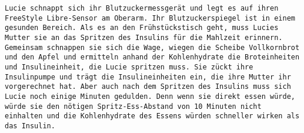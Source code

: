 		 \texttt{Lucie schnappt sich ihr Blutzuckermessgerät und legt es auf ihren\newline
		 	 FreeStyle Libre-Sensor am Oberarm. Ihr Blutzuckerspiegel ist in einem \newline 
		 	 gesunden Bereich. Als es an den Frühstückstisch geht, muss Lucies Mutter \newline
		 	 sie an das Spritzen des Insulins für die Mahlzeit erinnern. Gemeinsam \newline
		 	 schnappen sie sich die  Wage, wiegen die Scheibe Vollkornbrot \newline
		 	 und den Apfel und ermitteln anhand der Kohlenhydrate die Broteinheiten\newline
		 	  und Insulineinheit, die Lucie spritzen muss. Sie zückt ihre \newline
		 	 Insulinpumpe und trägt die Insulineinheiten ein, die ihre Mutter \newline
		 	 ihr vorgerechnet hat. Aber auch nach dem Spritzen des Insulins muss \newline 
		 	 sich Lucie noch einige Minuten gedulden. Denn wenn sie direkt essen \newline
		 	 würde, würde sie den nötigen Spritz-Ess-Abstand von 10 Minuten nicht \newline
		 	 einhalten und  die Kohlenhydrate des Essens würden schneller wirken \newline
		 	 als das Insulin. }\newline
